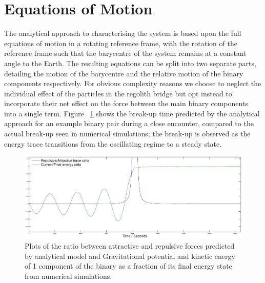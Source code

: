 \documentclass[letterpaper, preprint, paper,11pt]{AAS}	%
\begin{document}
\section{Equations of Motion}
The analytical approach to characterising the system is based upon the full equations of motion in a rotating reference frame, with the rotation of the reference frame such that the barycentre of the system remains at a constant angle to the Earth. The resulting equations can be split into two separate parts, detailing the motion of the barycentre and the relative motion of the binary components respectively. For obvious complexity reasons we choose to neglect the individual effect of the particles in the regolith bridge but opt instead to incorporate their net effect on the force between the main binary components into a single term. Figure ~\ref{fig:Analy} shows the break-up time predicted by the analytical approach for an example binary pair during a close encounter, compared to the actual break-up seen in numerical simulations; the break-up is observed as the energy trace transitions from the oscillating regime to a steady state.
\begin{figure}[H]
\centering
\includegraphics[width=1.2\textwidth]{binary_analy.eps} 
\caption{Plots of the ratio between attractive and repulsive forces predicted by analytical model and Gravitational potential and kinetic energy of 1 component of the binary as a fraction of its final energy state from numerical simulations.} 
\label{fig:Analy}
\end{figure} 
\end{document}
